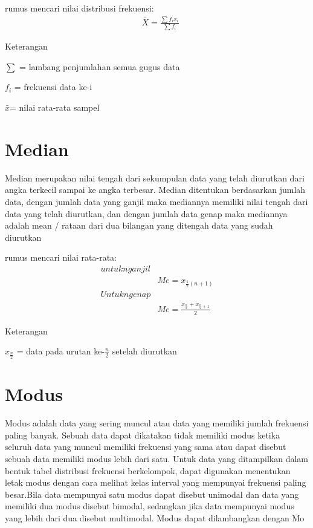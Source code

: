 \documentclass[11pt,fleqn]{book} %
\begin{document}
{\begin{theorem}[Mean]
rumus mencari nilai distribusi frekuensi:
\begin{align}
& \bar{X} = \frac{\sum f_{i}x_{i}}{\sum f_{i}} 
\end{align}
\end{theorem}

Keterangan
 
$ \sum $ = lambang penjumlahan semua gugus data

$ f_{i} $ = frekuensi data ke-i

$ \bar x $= nilai rata-rata sampel


\section{Median}

Median merupakan nilai tengah dari sekumpulan data yang telah diurutkan dari angka terkecil sampai ke angka terbesar. Median ditentukan berdasarkan jumlah data, dengan jumlah data yang ganjil maka mediannya memiliki nilai tengah dari data yang telah diurutkan, dan dengan jumlah data genap maka mediannya adalah mean / rataan dari dua bilangan yang ditengah data yang sudah diurutkan

\begin{theorem}[Mean]
rumus mencari nilai rata-rata:
\begin{align}
untuk n ganjil\\
& Me =x_{\frac{1}{2}(n+1)} \\
Untuk n genap\\
& Me =\frac{x_{\frac{n}{2}}+x_{\frac{n}{2}+1}}{2}
\end{align}
\end{theorem}

Keterangan 

$x_{\frac{n}{2}}$ = data pada urutan ke-$\frac{n}{2}$ setelah diurutkan


\section{Modus}

Modus adalah data yang sering muncul atau data yang memiliki jumlah frekuensi paling banyak. Sebuah data dapat dikatakan tidak memiliki modus ketika seluruh data yang muncul memiliki frekuensi yang sama atau dapat disebut sebuah data memiliki modus lebih dari satu.
Untuk data yang ditampilkan dalam bentuk tabel distribusi frekuensi berkelompok, dapat digunakan menentukan letak modus dengan cara melihat kelas interval yang mempunyai frekuensi paling besar.Bila data mempunyai satu modus dapat disebut unimodal dan data yang memiliki dua modus disebut bimodal, sedangkan jika data mempunyai modus yang lebih dari dua disebut multimodal. Modus dapat dilambangkan dengan Mo

}
\end{document}
